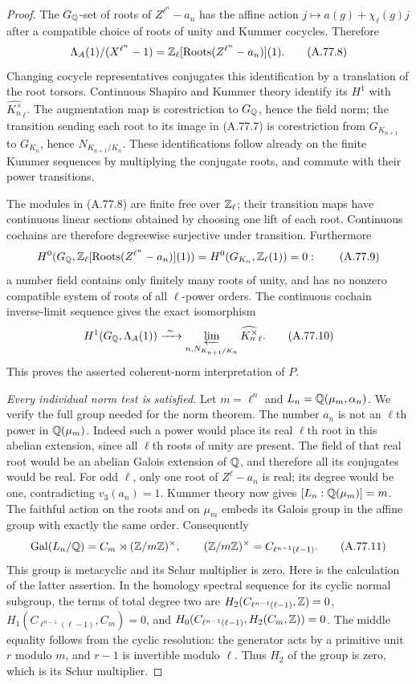 \begin{proof}
The $G_\mathbb Q$-set of roots of $Z^{\ell^n}-a_n$ has the affine
action $j\mapsto a(g)+\chi_\ell(g)j$ after a compatible choice
of roots of unity and Kummer cocycles.  Therefore
\[
 \Lambda_A(1)/(X^{\ell^n}-1)
   =\mathbb Z_\ell[\operatorname{Roots}(Z^{\ell^n}-a_n)](1).
 \tag{A.77.8}
\]
Changing cocycle representatives conjugates this identification
by a translation of the root torsors.
Continuous Shapiro and Kummer theory identify its $H^1$ with
$\widehat{K_n^\times}_{\ell}$.
The augmentation map is corestriction to $G_\mathbb Q$, hence the field
norm; the transition sending each root to its image in (A.77.7)
is corestriction from $G_{K_{n+1}}$ to $G_{K_n}$, hence
$N_{K_{n+1}/K_n}$.
These identifications follow already on the finite Kummer
sequences by multiplying the conjugate roots, and commute with
their power transitions.

The modules in (A.77.8) are finite free over $\mathbb Z_\ell$;
their transition maps have continuous linear sections obtained
by choosing one lift of each root.  Continuous cochains are
therefore degreewise surjective under transition.
Furthermore
\[
 H^0(G_\mathbb Q,\mathbb Z_\ell[\operatorname{Roots}(Z^{\ell^n}-a_n)](1))
       =H^0(G_{K_n},\mathbb Z_\ell(1))=0:
 \tag{A.77.9}
\]
a number field contains only finitely many roots of unity, and
has no nonzero compatible system of roots of all $\ell$-power
orders.  The continuous cochain inverse-limit sequence gives
the exact isomorphism
\[
 H^1(G_\mathbb Q,\Lambda_A(1))
   \xrightarrow{\ \sim\ }
 \varprojlim_{n,N_{K_{n+1}/K_n}}
             \widehat{K_n^\times}_{\ell}.
 \tag{A.77.10}
\]
This proves the asserted coherent-norm interpretation of $P$.

\emph{Every individual norm test is satisfied.}
Let $m=\ell^n$ and $L_n=\mathbb Q(\mu_m,\alpha_n)$.
We verify the full group needed for the norm theorem.
The number $a_n$ is not an $\ell$th power in $\mathbb Q(\mu_m)$.
Indeed such a power would place its real $\ell$th root in this
abelian extension, since all $\ell$th roots of unity are present.
The field of that real root would be an abelian Galois extension
of $\mathbb Q$, and therefore all its conjugates would be real.
For odd $\ell$, only one root of $Z^\ell-a_n$ is real;
its degree would be one, contradicting $v_3(a_n)=1$.
Kummer theory now gives
$[L_n:\mathbb Q(\mu_m)]=m$.
The faithful action on the roots and on $\mu_m$ embeds its
Galois group in the affine group with exactly the same order.
Consequently
\[
 \operatorname{Gal}(L_n/\mathbb Q)
   = C_m\rtimes(\mathbb Z/m\mathbb Z)^\times,
 \qquad (\mathbb Z/m\mathbb Z)^\times=C_{\ell^{n-1}(\ell-1)}.
 \tag{A.77.11}
\]
This group is metacyclic and its Schur multiplier is zero.
Here is the calculation of the latter assertion.  In the
homology spectral sequence for its cyclic normal subgroup,
the terms of total degree two are
$H_2(C_{\ell^{n-1}(\ell-1)},\mathbb Z)=0$,
$H_1(C_{\ell^{n-1}(\ell-1)},C_m)=0$, and
$H_0(C_{\ell^{n-1}(\ell-1)},H_2(C_m,\mathbb Z))=0$.
The middle equality follows from the cyclic resolution:
the generator acts by a primitive unit $r$ modulo $m$,
and $r-1$ is invertible modulo $\ell$.
Thus $H_2$ of the group is zero, which is its Schur multiplier.


\end{proof}
